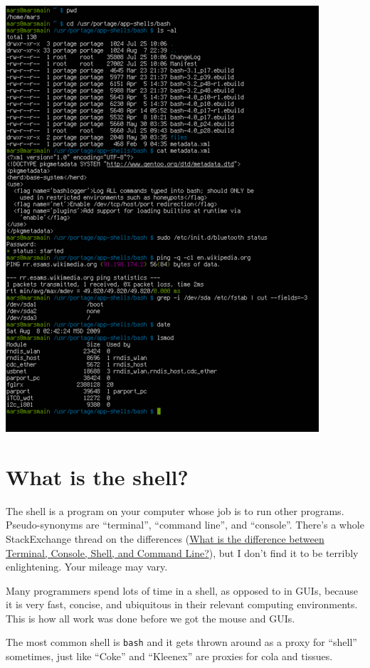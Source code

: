 \documentclass[
]{book}
\begin{document}
\includegraphics{img/440px-Bash_screenshot.png}

\section{What is the shell?}\label{what-is-the-shell}

The shell is a program on your computer whose job is to run other programs. Pseudo-synonyms are ``terminal'', ``command line'', and ``console''. There's a whole StackExchange thread on the differences (\href{https://askubuntu.com/questions/506510/what-is-the-difference-between-terminal-console-shell-and-command-line}{What is the difference between Terminal, Console, Shell, and Command Line?}), but I don't find it to be terribly enlightening. Your mileage may vary.

Many programmers spend lots of time in a shell, as opposed to in GUIs, because it is very fast, concise, and ubiquitous in their relevant computing environments. This is how all work was done before we got the mouse and GUIs.

The most common shell is \texttt{bash} and it gets thrown around as a proxy for ``shell'' sometimes, just like ``Coke'' and ``Kleenex'' are proxies for cola and tissues.
\end{document}
